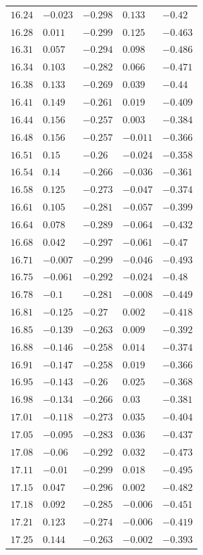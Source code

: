 \begin{center}
\begin{longtable}{lllll}
$16.24$&$-0.023$&$-0.298$&$0.133$&$-0.42$\\
$16.28$&$0.011$&$-0.299$&$0.125$&$-0.463$\\
$16.31$&$0.057$&$-0.294$&$0.098$&$-0.486$\\
$16.34$&$0.103$&$-0.282$&$0.066$&$-0.471$\\
$16.38$&$0.133$&$-0.269$&$0.039$&$-0.44$\\
$16.41$&$0.149$&$-0.261$&$0.019$&$-0.409$\\
$16.44$&$0.156$&$-0.257$&$0.003$&$-0.384$\\
$16.48$&$0.156$&$-0.257$&$-0.011$&$-0.366$\\
$16.51$&$0.15$&$-0.26$&$-0.024$&$-0.358$\\
$16.54$&$0.14$&$-0.266$&$-0.036$&$-0.361$\\
$16.58$&$0.125$&$-0.273$&$-0.047$&$-0.374$\\
$16.61$&$0.105$&$-0.281$&$-0.057$&$-0.399$\\
$16.64$&$0.078$&$-0.289$&$-0.064$&$-0.432$\\
$16.68$&$0.042$&$-0.297$&$-0.061$&$-0.47$\\
$16.71$&$-0.007$&$-0.299$&$-0.046$&$-0.493$\\
$16.75$&$-0.061$&$-0.292$&$-0.024$&$-0.48$\\
$16.78$&$-0.1$&$-0.281$&$-0.008$&$-0.449$\\
$16.81$&$-0.125$&$-0.27$&$0.002$&$-0.418$\\
$16.85$&$-0.139$&$-0.263$&$0.009$&$-0.392$\\
$16.88$&$-0.146$&$-0.258$&$0.014$&$-0.374$\\
$16.91$&$-0.147$&$-0.258$&$0.019$&$-0.366$\\
$16.95$&$-0.143$&$-0.26$&$0.025$&$-0.368$\\
$16.98$&$-0.134$&$-0.266$&$0.03$&$-0.381$\\
$17.01$&$-0.118$&$-0.273$&$0.035$&$-0.404$\\
$17.05$&$-0.095$&$-0.283$&$0.036$&$-0.437$\\
$17.08$&$-0.06$&$-0.292$&$0.032$&$-0.473$\\
$17.11$&$-0.01$&$-0.299$&$0.018$&$-0.495$\\
$17.15$&$0.047$&$-0.296$&$0.002$&$-0.482$\\
$17.18$&$0.092$&$-0.285$&$-0.006$&$-0.451$\\
$17.21$&$0.123$&$-0.274$&$-0.006$&$-0.419$\\
$17.25$&$0.144$&$-0.263$&$-0.002$&$-0.393$\\

\end{longtable}
\end{center}
